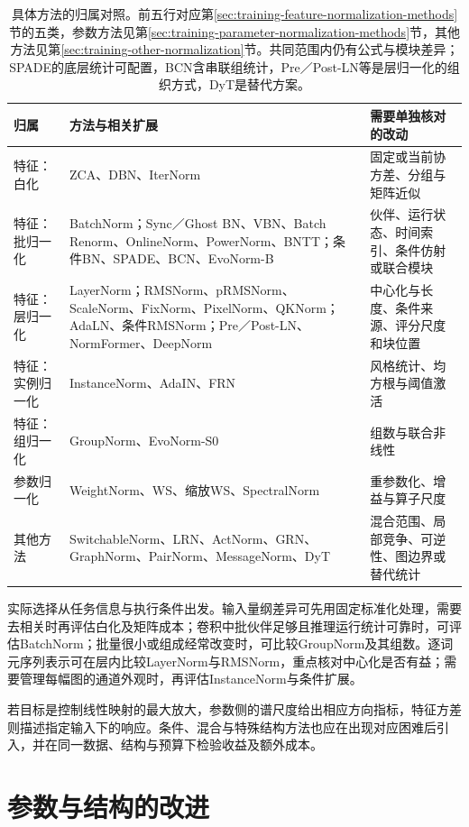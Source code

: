 \begin{table}[htbp]
  \centering\small
  \begin{tabularx}{\linewidth}{@{}p{26mm}p{85mm}X@{}}
    \toprule
    归属 & 方法与相关扩展 & 需要单独核对的改动 \\
    \midrule
    特征：白化 & ZCA、DBN、IterNorm & 固定或当前协方差、分组与矩阵近似 \\
    特征：批归一化 & BatchNorm；Sync／Ghost BN、VBN、Batch Renorm、OnlineNorm、PowerNorm、BNTT；条件BN、SPADE、BCN、EvoNorm-B & 伙伴、运行状态、时间索引、条件仿射或联合模块 \\
    特征：层归一化 & LayerNorm；RMSNorm、pRMSNorm、ScaleNorm、FixNorm、PixelNorm、QKNorm；AdaLN、条件RMSNorm；Pre／Post-LN、NormFormer、DeepNorm & 中心化与长度、条件来源、评分尺度和块位置 \\
    特征：实例归一化 & InstanceNorm、AdaIN、FRN & 风格统计、均方根与阈值激活 \\
    特征：组归一化 & GroupNorm、EvoNorm-S0 & 组数与联合非线性 \\
    参数归一化 & WeightNorm、WS、缩放WS、SpectralNorm & 重参数化、增益与算子尺度 \\
    其他方法 & SwitchableNorm、LRN、ActNorm、GRN、GraphNorm、PairNorm、MessageNorm、DyT & 混合范围、局部竞争、可逆性、图边界或替代统计 \\
    \bottomrule
  \end{tabularx}
  \caption{具体方法的归属对照。前五行对应第\ref{sec:training-feature-normalization-methods}节的五类，参数方法见第\ref{sec:training-parameter-normalization-methods}节，其他方法见第\ref{sec:training-other-normalization}节。共同范围内仍有公式与模块差异；SPADE的底层统计可配置，BCN含串联组统计，Pre／Post-LN等是层归一化的组织方式，DyT是替代方案。}
  \label{tab:training-normalization-extended-comparison}
\end{table}
\FloatBarrier

实际选择从任务信息与执行条件出发。输入量纲差异可先用固定标准化处理，需要去相关时再评估白化及矩阵成本；卷积中批伙伴足够且推理运行统计可靠时，可评估BatchNorm；批量很小或组成经常改变时，可比较GroupNorm及其组数。逐词元序列表示可在层内比较LayerNorm与RMSNorm，重点核对中心化是否有益；需要管理每幅图的通道外观时，再评估InstanceNorm与条件扩展。

若目标是控制线性映射的最大放大，参数侧的谱尺度给出相应方向指标，特征方差则描述指定输入下的响应。条件、混合与特殊结构方法也应在出现对应困难后引入，并在同一数据、结构与预算下检验收益及额外成本。

\section{参数与结构的改进}
\label{sec:training-connections}

